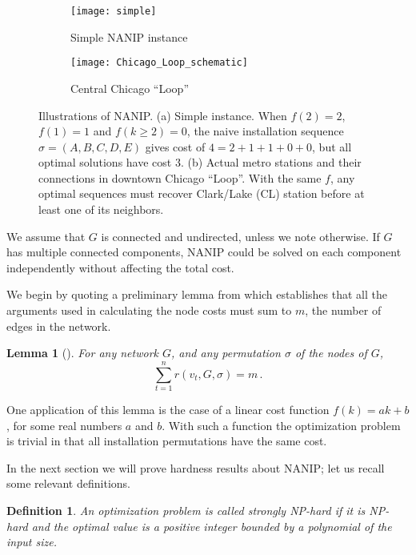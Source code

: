 \documentclass[english]{llncs}
\newtheorem{defn}[thm]{Definition}
\newtheorem{lem}[thm]{Lemma}
\begin{document}
\begin{figure}[th]
\begin{subfigure}[b]{0.4\textwidth}
\centering
\texttt{[image: simple]}
\caption{Simple NANIP instance}
\end{subfigure}\begin{subfigure}[b]{0.6\textwidth}
\centering
\texttt{[image: Chicago\_Loop\_schematic]} 
\caption{Central Chicago ``Loop''}
\end{subfigure}
\caption{Illustrations of NANIP.
(a) Simple instance.  
When $f(2)=2$, $f(1)=1$ and $f(k\geq2)=0$, the naive installation sequence $\sigma=(A,B,C,D,E)$
gives cost of $4=2+1+1+0+0$, but all optimal solutions have cost $3$.\label{fig:illustration}
(b) Actual metro stations and their connections in downtown Chicago ``Loop''.  
With the same $f$, any optimal sequences must recover Clark/Lake (CL) station before at least one of its neighbors.}
\end{figure}

We assume that $G$ is connected and undirected, unless we note otherwise. If
$G$ has multiple connected components, NANIP could be solved on each component
independently without affecting the total cost.

We begin by quoting a preliminary lemma from \cite{Gutfraind14} which
establishes that all the arguments used in calculating the node costs must sum
to $m$, the number of edges in the network.

\begin{lem}[\cite{Gutfraind14}]
\label{lem:edge-decomp}
For any network $G$, and any permutation $\sigma$ of the nodes of $G$, 
\begin{equation}
\sum_{t=1}^n r(v_t,G,\sigma) = m \label{eq:edge-decomp}\,.
\end{equation}
\end{lem}

One application of this lemma is the case of a linear cost function
$f(k)=ak+b$, for some real numbers $a$ and $b$.  With such a function the
optimization problem is trivial in that all installation permutations have the
same cost.

In the next section we will prove hardness results about NANIP; let us recall
some relevant definitions.

\begin{defn}

An optimization problem is called \emph{strongly NP-hard} if it is NP-hard and
the optimal value is a positive integer bounded by a polynomial of the input
size.

\end{defn}
\end{document}
